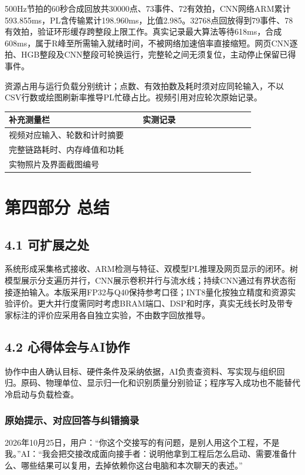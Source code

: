 \documentclass[UTF8,12pt,a4paper]{ctexart}
\begin{document}
500Hz节拍的60秒合成回放共30000点、73事件、72有效拍，CNN网络ARM累计593.855ms，PL含传输累计198.960ms，比值2.985。32768点回放得到79事件、78有效拍，验证环形缓存跨整段上限工作。真实记录最大算法等待618ms，合成608ms，属于R峰至所需输入就绪时间，不被网络加速倍率直接缩短。网页CNN逐拍、HGB整段及CNN整段可轮换运行，完整轮之间无须复位，主动停止保留已得事件。

资源占用与运行负载分别统计；点数、有效拍数及耗时须对应同轮输入，不以CSV行数或绘图刷新率推导PL忙碌占比。视频引用对应轮次原始记录。
\begin{longtable}{L{0.50\linewidth}L{0.42\linewidth}}
\toprule 补充测量栏 & 实测记录 \\ \midrule
视频对应输入、轮数和计时摘要 & \\
完整链路耗时、内存峰值和功耗 & \\
实物照片及界面截图编号 & \\
\bottomrule
\end{longtable}

\section{第四部分 总结}
\subsection{4.1 可扩展之处}
系统形成采集格式接收、ARM检测与特征、双模型PL推理及网页显示的闭环。树模型展示分支遍历并行，CNN展示卷积并行与流水线；持续CNN通过有界状态衔接逐拍输入。本版采用FP32与Q40保持参考口径；INT8量化按独立精度和资源实验评价。更大并行度需同时考虑BRAM端口、DSP和时序，真实无线长时及带专家标注的评价应采用各自独立实验，不由数字回放推导。


\subsection{4.2 心得体会与AI协作}
协作中由人确认目标、硬件条件及采纳依据，AI负责查资料、写实现与组织回归。原码、物理单位、显示归一化和识别质量分别验证；程序写入成功也不能替代冷启动与负载检查。

\subsubsection{原始提示、对应回答与纠错摘录}
2026年10月25日，用户：“你这个交接写的有问题，是别人用这个工程，不是我。”AI：“我会把交接改成面向接手者：说明他拿到工程后怎么启动、需要准备什么、哪些结果可以复用，去掉依赖你这台电脑和本次聊天的表述。”
\end{document}
